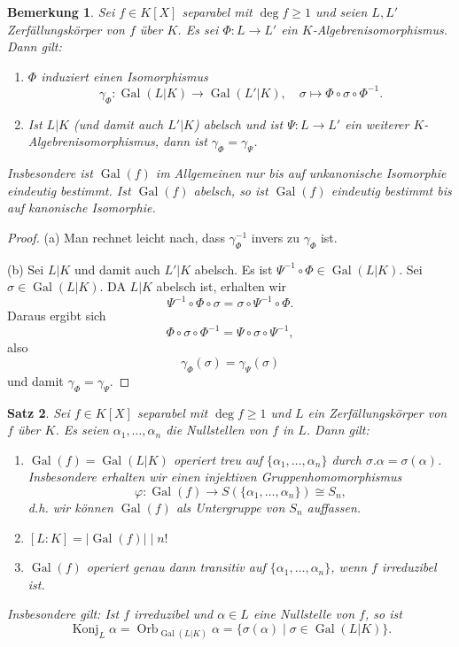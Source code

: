 \documentclass[a4paper, twoside, 11pt, ngerman]{report}
\DeclareMathOperator{\Gal}{Gal}
\DeclareMathOperator{\Konj}{Konj}
\DeclareMathOperator{\Orb}{Orb}
\theoremstyle{definistyle}
\newtheorem{satz}{Satz}[section]
\newtheorem{bem}[satz]{Bemerkung}
\theoremstyle{remark}
\begin{document}
\begin{bem}\label{bem:galgr_pol_unkan}
Sei $f \in K[X]$ separabel mit $\deg f \geq 1$ und seien $L, L'$ Zerfällungskörper von $f$ über $K$.
Es sei $\Phi \colon L \to L'$ ein $K$-Algebrenisomorphismus. Dann gilt:
\begin{enumerate}
    \item[(a)] $\Phi$ induziert einen Isomorphismus
    \[
    \gamma_\Phi \colon \Gal(L|K) \to \Gal(L'|K), \quad \sigma \mapsto \Phi \circ \sigma \circ \Phi^{-1}.
    \]
    \item[(b)] Ist $L|K$ (und damit auch $L'|K$) abelsch und ist $\Psi \colon L \to L'$ ein weiterer $K$-Algebrenisomorphismus, dann ist $\gamma_\Phi = \gamma_\Psi$.
\end{enumerate}
Insbesondere ist $\Gal(f)$ im Allgemeinen nur bis auf unkanonische Isomorphie eindeutig bestimmt. Ist $\Gal(f)$ abelsch, so ist $\Gal(f)$ eindeutig bestimmt bis auf kanonische Isomorphie.
\end{bem}
\begin{proof}
(a) Man rechnet leicht nach, dass $\gamma_\Phi^{-1}$ invers zu $\gamma_\Phi$ ist.

(b) Sei $L|K$ und damit auch $L'|K$ abelsch. Es ist $\Psi^{-1} \circ \Phi \in \Gal(L|K)$. Sei $\sigma \in \Gal(L|K)$.
DA $L|K$ abelsch ist, erhalten wir
\[
\Psi^{-1} \circ \Phi \circ \sigma = \sigma \circ \Psi^{-1} \circ \Phi.
\]
Daraus ergibt sich
\[
\Phi \circ \sigma \circ \Phi^{-1} = \Psi \circ \sigma \circ \Psi^{-1},
\]
also
\[
\gamma_\Phi(\sigma) = \gamma_\Psi(\sigma)
\]
und damit $\gamma_\Phi = \gamma_\Psi$.
\end{proof}


\begin{satz}\label{satz:galoisgruppe_eigenschaften}
Sei $f \in K[X]$ separabel mit $\deg f \geq 1$ und $L$ ein Zerfällungskörper von $f$ über $K$.
Es seien $\alpha_1, \dots, \alpha_n$ die Nullstellen von $f$ in $L$. Dann gilt:
\begin{enumerate}
\item[(a)] $\Gal(f) = \Gal(L|K)$ operiert treu auf $\{\alpha_1, \dots, \alpha_n\}$ durch $\sigma.\alpha=\sigma(\alpha)$.  
Insbesondere erhalten wir einen injektiven Gruppenhomomorphismus
\[
\varphi \colon \Gal(f) \to S(\{\alpha_1, \dots, \alpha_n\}) \cong S_n,
\]
d.h. wir können $\Gal(f)$ als Untergruppe von $S_n$ auffassen.
\item[(b)] $[L : K] = |\Gal(f)| \mid n!$
\item[(c)] $\Gal(f)$ operiert genau dann transitiv auf $\{\alpha_1, \dots, \alpha_n\}$, wenn $f$ irreduzibel ist.
\end{enumerate}
Insbesondere gilt: Ist $f$ irreduzibel und $\alpha\in L$ eine Nullstelle von $f$, so ist
\[
\Konj_L\alpha=\Orb_{\Gal(L|K)}\alpha=\{\sigma(\alpha) \mid \sigma\in\Gal(L|K)\}. 
\]
\end{satz}
\end{document}

